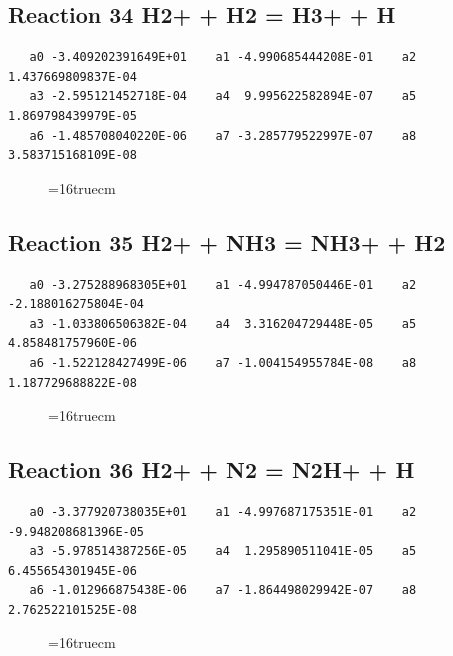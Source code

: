 \documentclass[12pt]{article}
\begin{document}
\subsection{
Reaction 34 H2+ + H2 = H3+ + H}
\begin{small}\begin{verbatim}
   a0 -3.409202391649E+01    a1 -4.990685444208E-01    a2  1.437669809837E-04
   a3 -2.595121452718E-04    a4  9.995622582894E-07    a5  1.869798439979E-05
   a6 -1.485708040220E-06    a7 -3.285779522997E-07    a8  3.583715168109E-08
   \end{verbatim}\end{small}
\begin{figure}[h!] \label{n2rates}
\epsfxsize=16truecm
\end{figure}
\newpage

\subsection{
Reaction 35 H2+ + NH3 = NH3+ + H2}
\begin{small}\begin{verbatim}
   a0 -3.275288968305E+01    a1 -4.994787050446E-01    a2 -2.188016275804E-04
   a3 -1.033806506382E-04    a4  3.316204729448E-05    a5  4.858481757960E-06
   a6 -1.522128427499E-06    a7 -1.004154955784E-08    a8  1.187729688822E-08
   \end{verbatim}\end{small}
\begin{figure}[h!] \label{n2rates}
\epsfxsize=16truecm
\end{figure}
\newpage

\subsection{
Reaction 36 H2+ + N2 = N2H+ + H}
\begin{small}\begin{verbatim}
   a0 -3.377920738035E+01    a1 -4.997687175351E-01    a2 -9.948208681396E-05
   a3 -5.978514387256E-05    a4  1.295890511041E-05    a5  6.455654301945E-06
   a6 -1.012966875438E-06    a7 -1.864498029942E-07    a8  2.762522101525E-08
   \end{verbatim}\end{small}
\begin{figure}[h!] \label{n2rates}
\epsfxsize=16truecm
\end{figure}
\newpage
\end{document}
